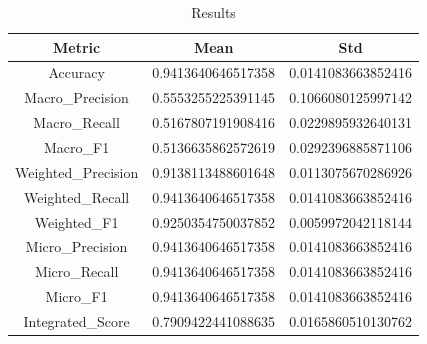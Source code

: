 \begin{table}[htbp]
\centering
\caption{Results}
\label{tab:csv}
\small
\setlength{\tabcolsep}{4pt}
\begin{tabular}{|c|c|c|}
\hline
Metric & Mean & Std \\
\hline
Accuracy & 0.9413640646517358 & 0.0141083663852416 \\
Macro_Precision & 0.5553255225391145 & 0.1066080125997142 \\
Macro_Recall & 0.5167807191908416 & 0.0229895932640131 \\
Macro_F1 & 0.5136635862572619 & 0.0292396885871106 \\
Weighted_Precision & 0.9138113488601648 & 0.0113075670286926 \\
Weighted_Recall & 0.9413640646517358 & 0.0141083663852416 \\
Weighted_F1 & 0.9250354750037852 & 0.0059972042118144 \\
Micro_Precision & 0.9413640646517358 & 0.0141083663852416 \\
Micro_Recall & 0.9413640646517358 & 0.0141083663852416 \\
Micro_F1 & 0.9413640646517358 & 0.0141083663852416 \\
Integrated_Score & 0.7909422441088635 & 0.0165860510130762 \\
\hline
\end{tabular}
\end{table}